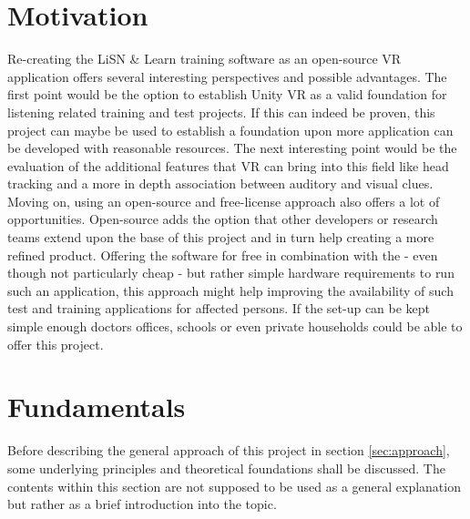 \documentclass[a4paper,11pt]{article}%
\renewcommand{\\}{\vspace*{0.5\baselineskip} \newline}
\begin{document}
\section{Motivation}
\label{sec:motivation}
Re-creating the \ac{LiSN} \& Learn training software as an open-source \ac{VR} application offers several interesting perspectives and possible advantages. The first point would be the option to establish Unity \ac{VR} as a valid foundation for listening related training and test projects. If this can indeed be proven, this project can maybe be used to establish a foundation upon more application can be developed with reasonable resources.
\newline
\newline
The next interesting point would be the evaluation of the additional features that \ac{VR} can bring into this field like head tracking and a more in depth association between auditory and visual clues.
\newline
\newline
Moving on, using an open-source and free-license approach also offers a lot of opportunities. Open-source adds the option that other developers or research teams extend upon the base of this project and in turn help creating a more refined product.
\newline
\newline
Offering the software for free in combination with the - even though not particularly cheap - but rather simple hardware requirements to run such an application, this approach might help improving the availability of such test and training applications for affected persons. If the set-up can be kept simple enough doctors offices, schools or even private households could be able to offer this project.


\section{Fundamentals}
\label{sec:fundamentals}
Before describing the general approach of this project in section \ref{sec:approach}, some underlying principles and theoretical foundations shall be discussed. The contents within this section are not supposed to be used as a general explanation but rather as a brief introduction into the topic.

\end{document}
